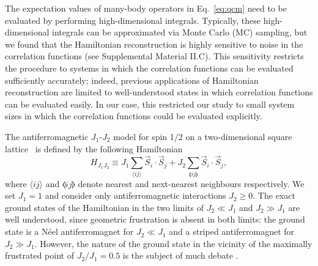 \documentclass[amsmath,amssymb,aps,prl,superscriptaddress,twocolumn,floatfix]{revtex4}
\begin{document}
The expectation values of many-body operators in Eq.~\eqref{eq:qcm} need to be evaluated by performing high-dimensional integrals.
Typically, these high-dimensional integrals can be approximated via Monte Carlo (MC) sampling, but we found that the Hamiltonian reconstruction is highly sensitive to noise in the correlation functions (see Supplemental Material II.C).
This sensitivity restricts the procedure to systems in which the correlation functions can be evaluated sufficiently accurately; indeed, previous applications of Hamiltonian reconstruction \cite{PhysRevX.8.031029,PhysRevB.99.020202} are limited to well-understood states in which correlation functions can be evaluated easily.
In our case, this restricted our study to small system sizes in which the correlation functions could be evaluated explicitly.

The antiferromagnetic $J_1$-$J_2$ model for spin 1/2 on a two-dimensional square lattice~\cite{PhysRevLett.63.2148,Schulz_1992} is defined by the  following Hamiltonian
\begin{equation}
   H_{J_1J_2} \equiv J_1 \sum_{\langle i j \rangle} \vec{S}_i \cdot \vec{S}_j + J_2 \sum_{\llangle i j \rrangle} \vec{S}_i \cdot \vec{S}_j,
   \label{eq:J1J2}
\end{equation}
where $\langle i j \rangle$ and $\llangle i j \rrangle$ denote nearest and next-nearest neighbours respectively.
We set $J_1=1$ and consider only antiferromagnetic interactions $J_2 \geq 0$. The exact ground states of the Hamiltonian in the two limits of $J_2\ll J_1$ and $J_2\gg J_1$ are well understood, since geometric frustration is absent in both limits: 
the ground state is a N\'{e}el antiferromagnet for $J_2\ll J_1$ and a striped antiferromagnet for $J_2\gg J_1$. 
 However, the nature of the ground state in the vicinity of the maximally frustrated point of $J_2/J_1=0.5$ is the subject of much debate \cite{WJHu2013, SSGong2014, HCJiang2012, Sachdev1990, Mambrini2006,JFYu2012, LWang2018, FFerrari2020, YNomura2020}.
\end{document}
